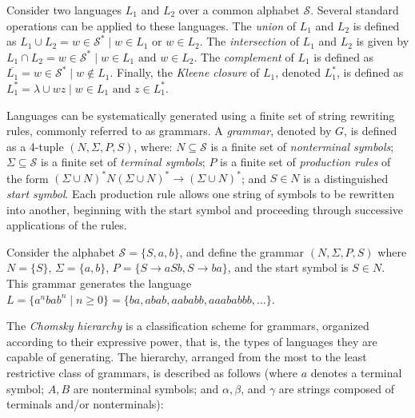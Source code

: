 Consider two languages $L_1$ and $L_2$ over a common alphabet $\mathcal{S}$. Several standard operations can be applied to these languages. The \emph{union} of $L_1$ and $L_2$ is defined as $L_1 \cup L_2 = { w \in \mathcal{S}^{\ast} \mid w \in L_1 \text{ or } w \in L_2 }$. The \emph{intersection} of $L_1$ and $L_2$ is given by $L_1 \cap L_2 = { w \in \mathcal{S}^{\ast} \mid w \in L_1 \text{ and } w \in L_2 }$. The \emph{complement} of $L_1$ is defined as $\overline{L_1} = { w \in \mathcal{S}^{\ast} \mid w \notin L_1 }$. Finally, the \emph{Kleene closure} of $L_1$, denoted $L_1^\ast$, is defined as $L_1^\ast = { \lambda } \cup { wz \mid w \in L_1 \text{ and } z \in L_1^\ast }$.

Languages can be systematically generated using a finite set of string rewriting rules, commonly referred to as grammars. A \emph{grammar}, denoted by $G$, is defined as a 4-tuple $(N, \Sigma, P, S)$, where: $N \subseteq \mathcal{S}$ is a finite set of \emph{nonterminal symbols}; $\Sigma \subseteq \mathcal{S}$ is a finite set of \emph{terminal symbols}; $P$ is a finite set of \emph{production rules} of the form $(\Sigma \cup N)^\ast N (\Sigma \cup N)^\ast \rightarrow (\Sigma \cup N)^\ast$; and $S \in N$ is a distinguished \emph{start symbol}. Each production rule allows one string of symbols to be rewritten into another, beginning with the start symbol and proceeding through successive applications of the rules.

\begin{example}
\label{ex:context_free_grammar}
Consider the alphabet $\mathcal{S} = \{ S, a, b \}$, and define the grammar $(N, \Sigma, P, S)$ where $N = \{ S \}$, $\Sigma = \{ a, b \}$, $P = \{ S \rightarrow aSb, S \rightarrow ba \}$, and the start symbol is $S \in N$. This grammar generates the language $L = \{ a^nbab^n \mid n\geq0 \} = \{ ba, abab, aababb, aaababbb, \ldots \}$.
\end{example}

The \emph{Chomsky hierarchy} is a classification scheme for grammars, organized according to their expressive power, that is, the types of languages they are capable of generating. The hierarchy, arranged from the most to the least restrictive class of grammars, is described as follows (where $a$ denotes a terminal symbol; $A, B$ are nonterminal symbols; and $\alpha, \beta$, and $\gamma$ are strings composed of terminals and/or nonterminals):

